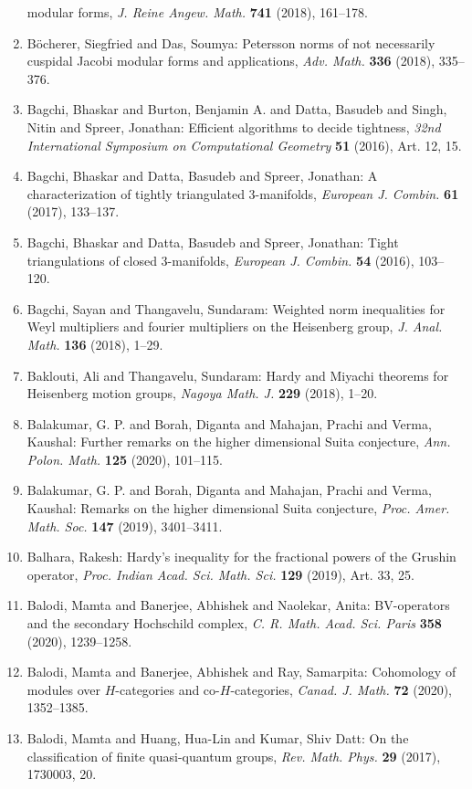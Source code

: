 \begin{enumerate}
modular forms, \emph{J. Reine Angew. Math.} {\bf 741} (2018), 161--178.
\item B\"{o}cherer, Siegfried and Das, Soumya: Petersson norms of not necessarily cuspidal {J}acobi modular
forms and applications, \emph{Adv. Math.} {\bf 336} (2018), 335--376.
\item Bagchi, Bhaskar and Burton, Benjamin A. and Datta, Basudeb and
Singh, Nitin and Spreer, Jonathan: Efficient algorithms to decide tightness, \emph{32nd {I}nternational {S}ymposium on {C}omputational
{G}eometry} {\bf 51} (2016), Art. 12, 15.
\item Bagchi, Bhaskar and Datta, Basudeb and Spreer, Jonathan: A characterization of tightly triangulated 3-manifolds, \emph{European J. Combin.} {\bf 61} (2017), 133--137.
\item Bagchi, Bhaskar and Datta, Basudeb and Spreer, Jonathan: Tight triangulations of closed 3-manifolds, \emph{European J. Combin.} {\bf 54} (2016), 103--120.
\item Bagchi, Sayan and Thangavelu, Sundaram: Weighted norm inequalities for {W}eyl multipliers and fourier
multipliers on the {H}eisenberg group, \emph{J. Anal. Math.} {\bf 136} (2018), 1--29.
\item Baklouti, Ali and Thangavelu, Sundaram: Hardy and {M}iyachi theorems for {H}eisenberg motion groups, \emph{Nagoya Math. J.} {\bf 229} (2018), 1--20.
\item Balakumar, G. P. and Borah, Diganta and Mahajan, Prachi and
Verma, Kaushal: Further remarks on the higher dimensional {S}uita conjecture, \emph{Ann. Polon. Math.} {\bf 125} (2020), 101--115.
\item Balakumar, G. P. and Borah, Diganta and Mahajan, Prachi and
Verma, Kaushal: Remarks on the higher dimensional {S}uita conjecture, \emph{Proc. Amer. Math. Soc.} {\bf 147} (2019), 3401--3411.
\item Balhara, Rakesh: Hardy's inequality for the fractional powers of the {G}rushin
operator, \emph{Proc. Indian Acad. Sci. Math. Sci.} {\bf 129} (2019), Art. 33, 25.
\item Balodi, Mamta and Banerjee, Abhishek and Naolekar, Anita: B{V}-operators and the secondary {H}ochschild complex, \emph{C. R. Math. Acad. Sci. Paris} {\bf 358} (2020), 1239--1258.
\item Balodi, Mamta and Banerjee, Abhishek and Ray, Samarpita: Cohomology of modules over {$H$}-categories and
co-{$H$}-categories, \emph{Canad. J. Math.} {\bf 72} (2020), 1352--1385.
\item Balodi, Mamta and Huang, Hua-Lin and Kumar, Shiv Datt: On the classification of finite quasi-quantum groups, \emph{Rev. Math. Phys.} {\bf 29} (2017), 1730003, 20.

\end{enumerate}
